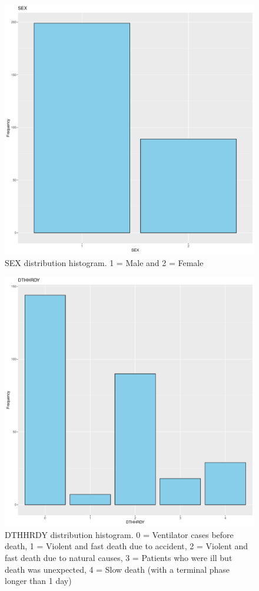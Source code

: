 \documentclass[a4paper, 11pt]{article}
\begin{document}
\begin{multicols}{2}
\begin{figure}[H]
	\centering
	\includegraphics[width=\columnwidth]{figures/clinical_data_var_dist/SEX}
	\caption{SEX distribution histogram. 1 = Male and 2 = Female}
	\label{fig:sexDistrib}
\end{figure}
\begin{figure}[H]
	\centering
	\includegraphics[width=\columnwidth]{figures/clinical_data_var_dist/DTHHRDY}
	\caption{DTHHRDY distribution histogram. 0 = Ventilator cases before death, 1 = Violent and fast death due to accident, 2 = Violent and fast death due to natural causes, 3 = Patients who were ill but death was unexpected, 4 = Slow death (with a terminal phase longer than 1 day)}
	\label{fig:dthhrdyDistrib}
\end{figure}


\end{multicols}
\end{document}
